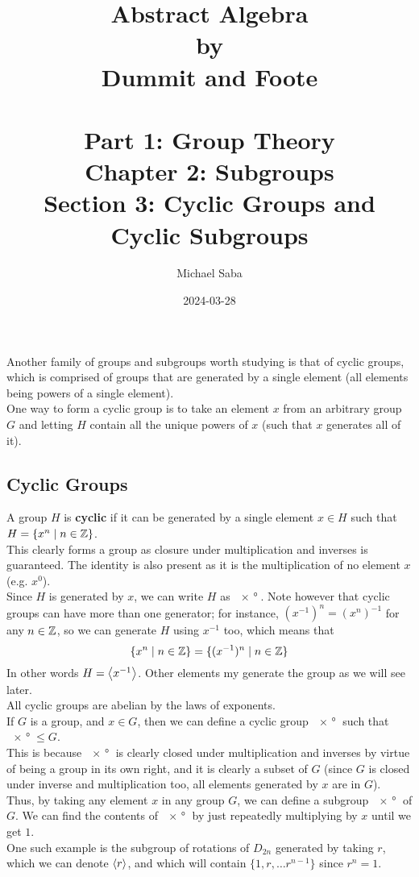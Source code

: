\documentclass[12pt]{article}
\title{%
    \Huge Abstract Algebra \\
    \large by \\
    \Large Dummit and Foote \\~\\
    \huge Part 1: Group Theory \\
    \LARGE Chapter 2: Subgroups \\
    \Large Section 3: Cyclic Groups and Cyclic Subgroups
}
\date{2024-03-28}
\author{Michael Saba}
\begin{document}
    \maketitle
    \newpage
    \setlength{\parindent}{0pt}

   
    Another family of groups and subgroups worth studying
    is that of cyclic groups,
    which is comprised of groups that are generated
    by a single element
    (all elements being powers of a single element). \\
    One way to form a cyclic group is to take an element $x$
    from an arbitrary group $G$
    and letting $H$ contain all the unique powers of $x$
    (such that $x$ generates all of it). \\


    \subsection*{Cyclic Groups}

    A group $H$ is \textbf{cyclic}
    if it can be generated by a single element 
    $x \in H$ such that $H = \{ x^n \mid n \in \mathbb{Z} \}$. \\
    This clearly forms a group as closure under multiplication
    and inverses is guaranteed.
    The identity is also present as it is the multiplication of
    no element $x$ (e.g. $x^0$). \\
    Since $H$ is generated by $x$,
    we can write $H$ as $\ang{x}$.
    Note however that cyclic groups can have more than one generator;
    for instance, $(x^{-1})^n = (x^n)^{-1}$ for any $n \in \mathbb{Z}$,
    so we can generate $H$ using $x^{-1}$ too,
    which means that
    \[ \{ x^n \mid n \in \mathbb{Z} \} = \{ (x^{-1})^n \mid n \in \mathbb{Z} \} \]
    In other words $H = \left\langle x^{-1} \right\rangle$.
    Other elements my generate the group as we will see later. \\

    All cyclic groups are abelian by the laws of exponents. \\

    If $G$ is a group, and $x \in G$,
    then we can define a cyclic group $\ang{x}$
    such that $\ang{x} \leqslant G$. \\
    This is because $\ang{x}$ is clearly closed under
    multiplication and inverses
    by virtue of being a group in its own right,
    and it is clearly a subset of $G$
    (since $G$ is closed under inverse and multiplication too,
    all elements generated by $x$ are in $G$). \\
    Thus, by taking any element $x$ in any group $G$,
    we can define a subgroup $\ang{x}$ of $G$.
    We can find the contents of $\ang{x}$
    by just repeatedly multiplying by $x$ until we get $1$. \\
    One such example is the subgroup of rotations of $D_{2n}$
    generated by taking $r$,
    which we can denote $\left\langle r \right\rangle$,
    and which will contain
    $\{1, r, \dots r^{n-1}\}$ since $r^n = 1$. \\
\end{document}
